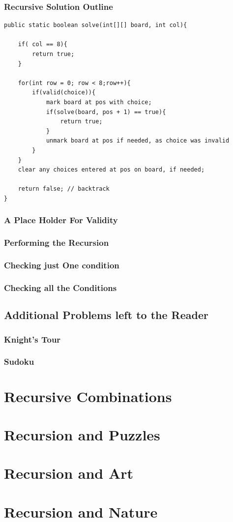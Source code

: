 \subsubsection{Recursive Solution Outline}
\begin{verbatim}
public static boolean solve(int[][] board, int col){
	
	if( col == 8){
		return true;
	}
	
	for(int row = 0; row < 8;row++){
		if(valid(choice)){
			mark board at pos with choice;
			if(solve(board, pos + 1) == true){
				return true;
			}
			unmark board at pos if needed, as choice was invalid
		}
	}
	clear any choices entered at pos on board, if needed;
	
	return false; // backtrack
}

\end{verbatim}

\subsubsection{A Place Holder For Validity}

\subsubsection{Performing the Recursion}

\subsubsection{Checking just One condition}


\subsubsection{Checking all the Conditions}




\subsection{Additional Problems left to the Reader}

\subsubsection{Knight's Tour}

\subsubsection{Sudoku}




\section{Recursive Combinations}



\section{Recursion and Puzzles}



\section{Recursion and Art}

\section{Recursion and Nature}

